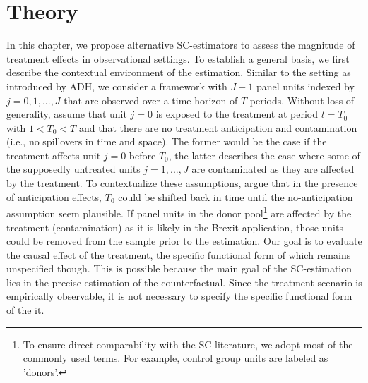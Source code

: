 \section{Theory}
\label{Chap3}
\begin{comment}
\textcolor{magenta}{\textbf{What must be clear by now
	 \begin{itemize}
	 	\item Consider case without covariates
	 	\item Make clear that SC is a weighted average of the donors
	 \end{itemize}}}
\end{comment}
In this chapter, we propose alternative \ac{SC}-estimators to assess the magnitude of treatment effects in observational settings. To establish a general basis, we first describe the contextual environment of the estimation. Similar to the setting as introduced by \ac{ADH}, we consider a framework with $J+1$ panel units indexed by $j = 0,1, ..., J$ that are observed over a time horizon of $T$ periods. Without loss of generality, assume that unit $j = 0$ is exposed to the treatment at period $t = T_0$ with $1 < T_0 < T$ and that there are no treatment anticipation and contamination (i.e., no spillovers in time and space). The former would be the case if the treatment affects unit $j = 0$ before $T_0$, the latter describes the case where some of the supposedly untreated units $j = 1,...,J$ are contaminated as they are affected by the treatment. To contextualize these assumptions, \cite{abadie:2010} argue that in the presence of anticipation effects, $T_0$ could be shifted back in time until the no-anticipation assumption seem plausible. If panel units in the donor pool\footnote{To ensure direct comparability with the \ac{SC} literature, we adopt most of the commonly used terms. For example, control group units are labeled as 'donors'.} are affected by the treatment (contamination) as it is likely in the Brexit-application, those units could be removed from the sample prior to the estimation. Our goal is to evaluate the causal effect of the treatment, the specific functional form of which remains unspecified though. This is possible because the main goal of the \ac{SC}-estimation lies in the precise estimation of the counterfactual. Since the treatment  scenario is empirically observable, it is not necessary to specify the specific functional form of the it. 

